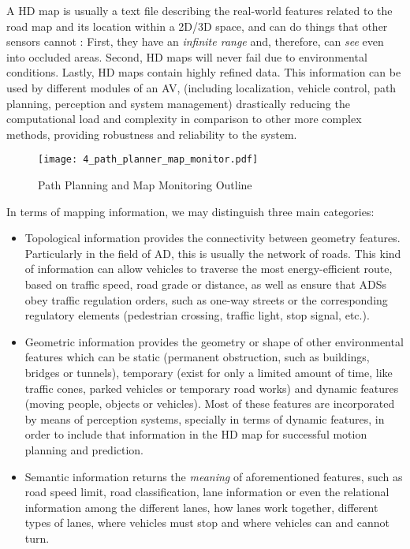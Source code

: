 A HD map is usually a text file describing the real-world features related to the road map and its location within a 2D/3D space, and can do things that other sensors cannot \cite{wong2020mapping}: First, they have an \textit{infinite range} and, therefore, can \textit{see} even into occluded areas. Second, HD maps will never fail due to environmental conditions. Lastly, HD maps contain highly refined data. This information can be used by different modules of an AV, (including localization, vehicle control, path planning, perception and system management) drastically reducing the computational load and complexity in comparison to other more complex methods, providing robustness and reliability to the system.

\begin{figure}[] 
	\centering
	\texttt{[image: 4\_path\_planner\_map\_monitor.pdf]}
	\caption{Path Planning and Map Monitoring Outline}
	\label{fig:4_path_planner_map_monitor}
\end{figure}

In terms of mapping information, we may distinguish three main categories:

\begin{itemize}
	\item Topological information provides the connectivity between geometry features. Particularly in the field of \ac{AD}, this is usually the network of roads. This kind of information can allow vehicles to traverse the most energy-efficient route, based on traffic speed, road grade or distance, as well as ensure that \acp{ADS} obey traffic regulation orders, such as one-way streets or the corresponding regulatory elements (pedestrian crossing, traffic light, stop signal, etc.).
	\item Geometric information provides the geometry or shape of other environmental features which can be static (permanent obstruction, such as buildings, bridges or tunnels), temporary (exist for only a limited amount of time, like traffic cones, parked vehicles or temporary road works) and dynamic features (moving people, objects or vehicles). Most of these features are incorporated by means of perception systems, specially in terms of dynamic features, in order to include that information in the HD map for successful motion planning and prediction.
	\item Semantic information returns the \textit{meaning} of aforementioned features, such as road speed limit, road classification, lane information or even the relational information among the different lanes, \ie how lanes work together, different types of lanes, where vehicles must stop and where vehicles can and cannot turn.
\end{itemize}

